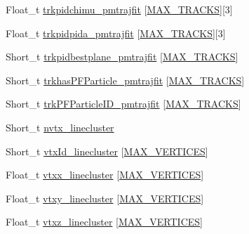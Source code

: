 \begin{DoxyCompactItemize}
\item 
Float\-\_\-t \hyperlink{classanatree_ad41d442e1477f440a9f3fcb58ecf75f0}{trkpidchimu\-\_\-pmtrajfit} \mbox{[}\hyperlink{anatree__core__v09410002_8h_a327fd4e796e4a0d78947524c96e4362e}{M\-A\-X\-\_\-\-T\-R\-A\-C\-K\-S}\mbox{]}\mbox{[}3\mbox{]}
\item 
Float\-\_\-t \hyperlink{classanatree_a08f534ef3bcf5ffe47fe7382a521b5bb}{trkpidpida\-\_\-pmtrajfit} \mbox{[}\hyperlink{anatree__core__v09410002_8h_a327fd4e796e4a0d78947524c96e4362e}{M\-A\-X\-\_\-\-T\-R\-A\-C\-K\-S}\mbox{]}\mbox{[}3\mbox{]}
\item 
Short\-\_\-t \hyperlink{classanatree_ae7cc9eb4cbf68978ab8bbf7da5ff916a}{trkpidbestplane\-\_\-pmtrajfit} \mbox{[}\hyperlink{anatree__core__v09410002_8h_a327fd4e796e4a0d78947524c96e4362e}{M\-A\-X\-\_\-\-T\-R\-A\-C\-K\-S}\mbox{]}
\item 
Short\-\_\-t \hyperlink{classanatree_a0001ea589d625af0a469d81ac4ab354d}{trkhas\-P\-F\-Particle\-\_\-pmtrajfit} \mbox{[}\hyperlink{anatree__core__v09410002_8h_a327fd4e796e4a0d78947524c96e4362e}{M\-A\-X\-\_\-\-T\-R\-A\-C\-K\-S}\mbox{]}
\item 
Short\-\_\-t \hyperlink{classanatree_a3b82c4cb8ab4a905b058baadd1533346}{trk\-P\-F\-Particle\-I\-D\-\_\-pmtrajfit} \mbox{[}\hyperlink{anatree__core__v09410002_8h_a327fd4e796e4a0d78947524c96e4362e}{M\-A\-X\-\_\-\-T\-R\-A\-C\-K\-S}\mbox{]}
\item 
Short\-\_\-t \hyperlink{classanatree_ae8a9245846fa5bf357860f3ab6a17c5c}{nvtx\-\_\-linecluster}
\item 
Short\-\_\-t \hyperlink{classanatree_a767a1b4ace99de6ac95968bbe5fb3f8d}{vtx\-Id\-\_\-linecluster} \mbox{[}\hyperlink{anatree__core__v09410002_8h_a6ac49acb0970e608315ca232a9fc8828}{M\-A\-X\-\_\-\-V\-E\-R\-T\-I\-C\-E\-S}\mbox{]}
\item 
Float\-\_\-t \hyperlink{classanatree_ae231dc3326af03fc901759bcb6c39f5c}{vtxx\-\_\-linecluster} \mbox{[}\hyperlink{anatree__core__v09410002_8h_a6ac49acb0970e608315ca232a9fc8828}{M\-A\-X\-\_\-\-V\-E\-R\-T\-I\-C\-E\-S}\mbox{]}
\item 
Float\-\_\-t \hyperlink{classanatree_aa533a7342c56e573951125ec11daeb13}{vtxy\-\_\-linecluster} \mbox{[}\hyperlink{anatree__core__v09410002_8h_a6ac49acb0970e608315ca232a9fc8828}{M\-A\-X\-\_\-\-V\-E\-R\-T\-I\-C\-E\-S}\mbox{]}
\item 
Float\-\_\-t \hyperlink{classanatree_ac30b6e15a59a3f9196f6dd657e56c373}{vtxz\-\_\-linecluster} \mbox{[}\hyperlink{anatree__core__v09410002_8h_a6ac49acb0970e608315ca232a9fc8828}{M\-A\-X\-\_\-\-V\-E\-R\-T\-I\-C\-E\-S}\mbox{]}

\end{DoxyCompactItemize}

